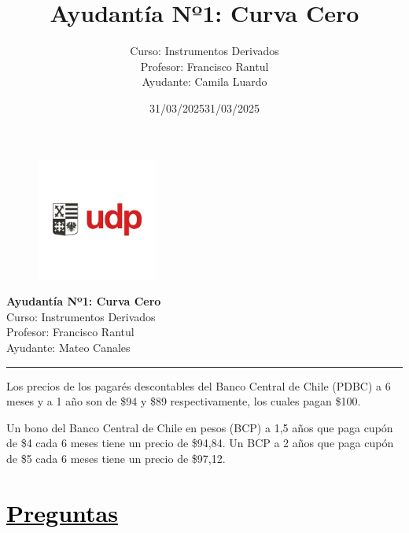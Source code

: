\documentclass[12pt]{article}
\title{Ayudantía Nº1: Curva Cero}
\author{Curso: Instrumentos Derivados\\
Profesor: Francisco Rantul\\
Ayudante: Camila Luardo}
\date{31/03/2025}
\newcommand{\subrayadoRojo}[1]{{\color{rojoudp}\underline{\textcolor{black}{#1}}}}
\begin{document}
\begin{figure}
    \vspace{-5em}    
    \flushright
    \includegraphics[height=4cm]{../imagenes/logo.png}\\[-3em]
\end{figure}
\begin{center}
    {\LARGE \textbf{Ayudantía Nº1: Curva Cero}}\\[0.5em]
    Curso: Instrumentos Derivados\\
    Profesor: Francisco Rantul\\
    Ayudante: Mateo Canales\\
    \date{31/03/2025}
\end{center}
\vspace{1pt}
{\color{rojoudp}\hrule height 2pt}
\vspace{10pt}

Los precios de los pagarés descontables del Banco Central de Chile (PDBC)
 a 6 meses y a 1 año son de \$94 y \$89 respectivamente, los cuales pagan \$100. 
  
 Un bono del Banco Central de Chile en pesos (BCP) a 1,5 años que paga cupón de 
 \$4 cada 6 meses tiene un precio de \$94{,}84. Un BCP a 2 años que paga
 cupón de \$5 cada 6 meses tiene un precio de \$97{,}12.

\section*{\subrayadoRojo{Preguntas}}
\end{document}
